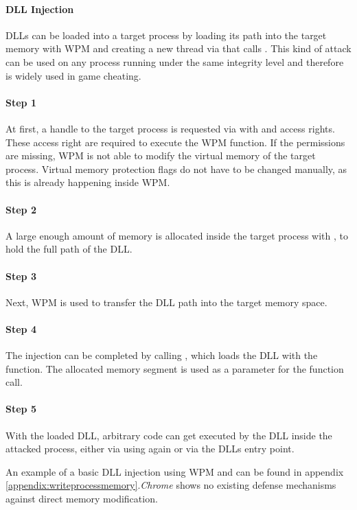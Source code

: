 \paragraph{ \gls{DLL} Injection}
\glspl{DLL} can be loaded into a target process by loading its path into the target memory with \gls{WPM} and creating a new thread via  that calls . This kind of attack can be used on any process running under the same integrity level and therefore is widely used in game cheating.

\paragraph{Step 1} 
At first, a handle to the target process is requested via  with  and  access rights. These access right are required to execute the \gls{WPM} function. If the permissions are missing, \gls{WPM} is not able to modify the virtual memory of the target process. Virtual memory protection flags do not have to be changed manually, as this is already happening inside \gls{WPM}. 

\paragraph{Step 2} 
A large enough amount of memory is allocated inside the target process with , to hold the full path of the \gls{DLL}. 

\paragraph{Step 3}
Next, \gls{WPM} is used to transfer the \gls{DLL} path into the target memory space.

\paragraph{Step 4}
The injection can be completed by calling , which loads the \gls{DLL} with the  function. The allocated memory segment is used as a parameter for the  function call. 

\paragraph{Step 5}
With the loaded \gls{DLL}, arbitrary code can get executed by the \gls{DLL} inside the attacked process, either via using  again or via the \glspl{DLL} entry point.


An example of a basic \gls{DLL} injection using \gls{WPM} and  can be found in appendix \ref{appendix:writeprocessmemory}.\emph{Chrome} shows no existing defense mechanisms against direct memory modification.